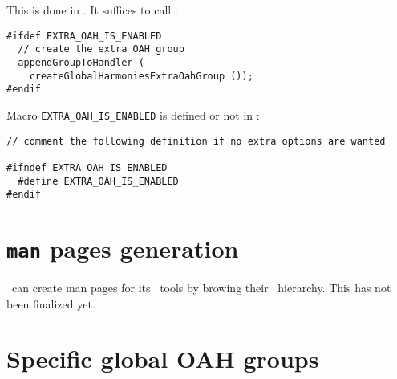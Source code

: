 This is done in . It suffices to call :
\begin{lstlisting}[language=CPlusPlus]
#ifdef EXTRA_OAH_IS_ENABLED
  // create the extra OAH group
  appendGroupToHandler (
    createGlobalHarmoniesExtraOahGroup ());
#endif
\end{lstlisting}

Macro {\tt EXTRA_OAH_IS_ENABLED} is defined or not in :
\begin{lstlisting}[language=CPlusPlus]
// comment the following definition if no extra options are wanted

#ifndef EXTRA_OAH_IS_ENABLED
  #define EXTRA_OAH_IS_ENABLED
#endif
\end{lstlisting}


%


\section{{\tt man} pages generation}

\mf\ can create man pages for its \CLI\ tools by browing their \oahRepr\ hierarchy. This has not been finalized yet.%


\section{Specific global OAH groups}

